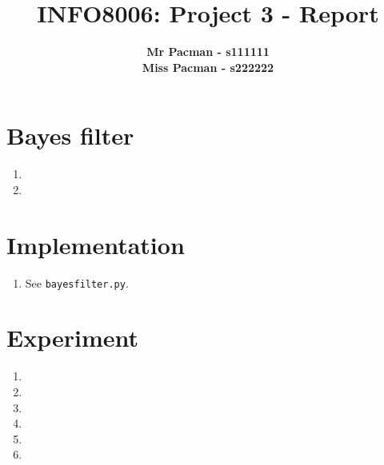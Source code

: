 \documentclass{article}
\begin{document}

\title{\Large{INFO8006: Project 3 - Report}}
\vspace{1cm}
\author{\small{\bf Mr Pacman - s111111} \\ \small{\bf Miss Pacman - s222222}}

\maketitle


\section{Bayes filter}

\begin{enumerate}[label=\alph*.]
    \item
    \item
\end{enumerate}

\section{Implementation}

\begin{enumerate}[label=\alph*.]
    \item See \texttt{bayesfilter.py}.
\end{enumerate}

\section{Experiment}

\begin{enumerate}[label=\alph*.]
    \item
    \item
    \item
    \item
    \item
    \item
\end{enumerate}

\end{document}
